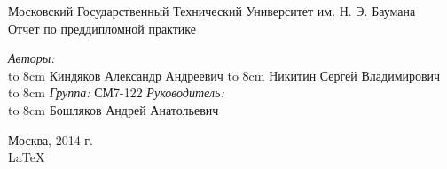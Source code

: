 \documentclass{article}
\begin{document}
\begin{titlepage}
\begin{center}
    {\large Московский Государственный Технический Университет им. Н. Э. Баумана}
    \\[5cm]
    {\Large Отчет по преддипломной практике}
    \\[5cm]

    \begin{flushright}
        \begin{minipage}{0.5\textwidth}
            \begin{flushleft}
                \textit{Авторы:} \\
                \hbox to 8cm {Киндяков Александр Андреевич \hfil \underline{\hspace{2cm} } }
                \vspace{\baselineskip}
                \hbox to 8cm {Никитин Сергей Владимирович \hfil \underline{\hspace{2cm} } }
                \vspace{\baselineskip}
                \hbox to 8cm {\textit{Группа:} \hfil СМ7-122}
                \vspace{2cm}
                \textit{Руководитель:} \\
                \hbox to 8cm {Бошляков Андрей Анатольевич \hfil \underline{\hspace{2cm} } }
            \end{flushleft}
        \end{minipage}
    \end{flushright}

    \vfill %
    Москва, 2014 г. \\
    \LaTeX
\end{center}
\end{titlepage}



\end{document}
